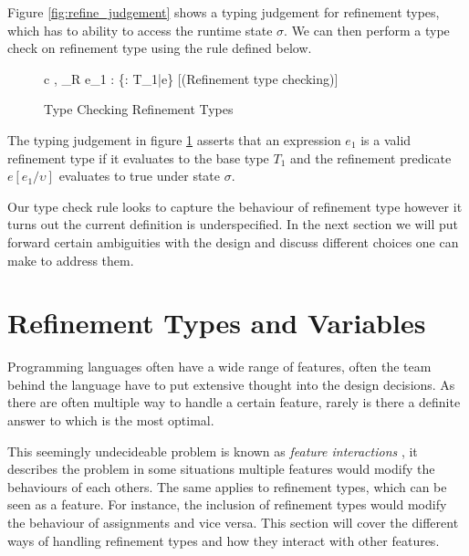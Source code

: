 \documentclass[a4paper,12pt]{report}
\begin{document}
\par
Figure \ref{fig:refine_judgement} shows a typing judgement for refinement 
types, which has to ability to access the runtime state $\sigma$. We can then 
perform a type check on refinement type using the rule defined below. 

\begin{figure}[H]
  \begin{center}
    \begin{tabular} {c}
      {\sigma, \Gamma \vdash_{R} e_1 : \{\upsilon : T_1\text{ }|\text{ }e\}} [(Refinement type checking)]
    \end{tabular}
  \end{center}
  \caption{Type Checking Refinement Types}
  \label{fig:refine_typecheck}
\end{figure}

\par
The typing judgement in figure \ref{fig:refine_typecheck} asserts that an expression 
$e_1$ is a valid refinement type if it evaluates to the base type $T_1$ and 
the refinement predicate $e[e_1/\upsilon]$ evaluates to true under state 
$\sigma$.

\par
Our type check rule looks to capture the behaviour of refinement type however it 
turns out the current definition is underspecified. In the next section we 
will put forward certain ambiguities with the design and discuss different choices 
one can make to address them.

\section{Refinement Types and Variables}
Programming languages often have a wide range of features, often the team behind 
the language have to put extensive thought into the design decisions. As there 
are often multiple way to handle a certain feature, rarely is there a definite 
answer to which is the most optimal.

\par
This seemingly undecideable problem is known as \textit{feature interactions} 
\cite{featInteract}, it describes the problem in some situations multiple 
features would modify the behaviours of each others. The same applies to 
refinement types, which can be seen as a feature. For instance, the inclusion 
of refinement types would modify the behaviour of assignments and vice versa. 
This section will cover the different ways of handling refinement types and how 
they interact with other features.
\end{document}
